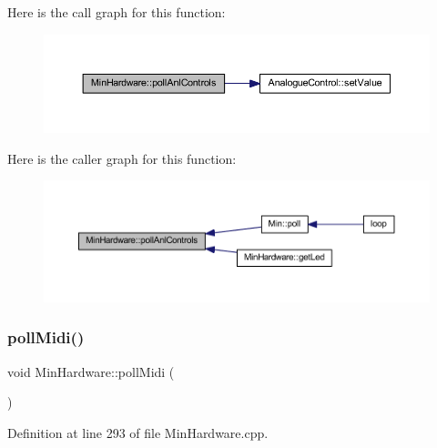 Here is the call graph for this function\+:
\nopagebreak
\begin{figure}[H]
\begin{center}
\leavevmode
\includegraphics[width=350pt]{d0/d93/class_min_hardware_afa6cdaaab625ffd44c733c6ff9e29f4d_cgraph}
\end{center}
\end{figure}
Here is the caller graph for this function\+:
\nopagebreak
\begin{figure}[H]
\begin{center}
\leavevmode
\includegraphics[width=350pt]{d0/d93/class_min_hardware_afa6cdaaab625ffd44c733c6ff9e29f4d_icgraph}
\end{center}
\end{figure}
\mbox{\label{class_min_hardware_a4978945a745e4c2690e05789eff52976}} 
\subsubsection{\texorpdfstring{poll\+Midi()}{pollMidi()}}
{\footnotesize\ttfamily void Min\+Hardware\+::poll\+Midi (\begin{DoxyParamCaption}{ }\end{DoxyParamCaption})}



Definition at line 293 of file Min\+Hardware.\+cpp.

